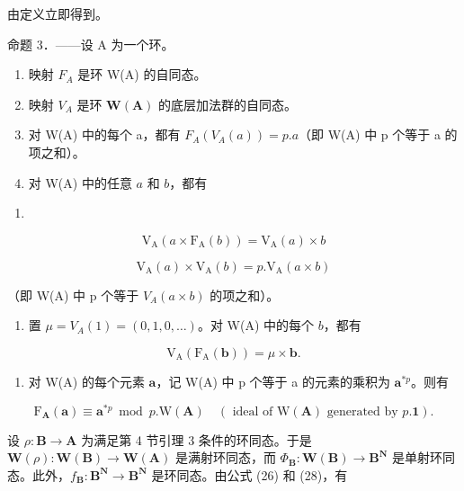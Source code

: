 由定义立即得到。

命题 3．——设 A 为一个环。

\begin{enumerate}
\def\labelenumi{\alph{enumi})}
\item
  映射 \(F_{A}\) 是环 W(A) 的自同态。
\item
  映射 \(V_{A}\) 是环 \(\mathbf{W}(\mathbf{A})\) 的底层加法群的自同态。
\item
  对 W(A) 中的每个 a，都有 \(F_{A}(V_{A}(a)) = p.a\)（即 W(A) 中 p 个等于 a 的项之和）。
\item
  对 W(A) 中的任意 \(a\) 和 \(b\)，都有
\end{enumerate}

\begin{enumerate}
\def\labelenumi{(\arabic{enumi})}
\setcounter{enumi}{29}
\tightlist
\item
\end{enumerate}

\[
\mathrm{V} _ {\mathrm{A}} (a \times \mathrm{F} _ {\mathrm{A}} (b)) = \mathrm{V} _ {\mathrm{A}} (a) \times b\tag{31}
\]

\[
\mathrm{V} _ {\mathrm{A}} (a) \times \mathrm{V} _ {\mathrm{A}} (b) = p. \mathrm{V} _ {\mathrm{A}} (a \times b)
\]

（即 W(A) 中 p 个等于 \(V_A(a \times b)\) 的项之和）。

\begin{enumerate}
\def\labelenumi{\alph{enumi})}
\setcounter{enumi}{4}
\tightlist
\item
  置 \(\mu = V_{A}(1) = (0, 1, 0, \ldots)\)。对 W(A) 中的每个 \(b\)，都有
\end{enumerate}

\[
\mathrm{V} _ {\mathrm{A}} \left(\mathrm{F} _ {\mathrm{A}} (\boldsymbol {b})\right) = \mu \times \boldsymbol {b}.\tag{32}
\]

\begin{enumerate}
\def\labelenumi{\alph{enumi})}
\setcounter{enumi}{5}
\tightlist
\item
  对 W(A) 的每个元素 \(\mathbf{a}\)，记 W(A) 中 p 个等于 a 的元素的乘积为 \(\mathbf{a}^{*p}\)。则有
\end{enumerate}

\[
\mathrm{F} _ {\mathbf {A}} (\boldsymbol {a}) \equiv \boldsymbol {a} ^ {* p} \bmod p. \mathrm{W} (\mathbf {A}) \quad (\text { ideal of } \mathrm{W} (\mathbf {A}) \text { generated by } p. \mathbf {1}).\tag{33}
\]

设 \(\rho: \mathbf{B} \to \mathbf{A}\) 为满足第 4 节引理 3 条件的环同态。于是 \(\mathbf{W}(\rho): \mathbf{W}(\mathbf{B}) \to \mathbf{W}(\mathbf{A})\) 是满射环同态，而 \(\Phi_{\mathbf{B}}: \mathbf{W}(\mathbf{B}) \to \mathbf{B}^{\mathbf{N}}\) 是单射环同态。此外，\(f_{\mathbf{B}}: \mathbf{B}^{\mathbf{N}} \to \mathbf{B}^{\mathbf{N}}\) 是环同态。由公式 (26) 和 (28)，有

